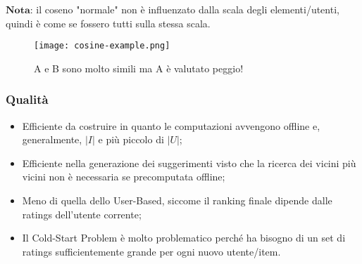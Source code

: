             $\textbf{Nota:}$ il coseno "normale" non è influenzato dalla scala degli elementi/utenti, quindi è come se fossero tutti sulla stessa scala.
                \begin{figure}[h]
                    \caption{A e B sono molto simili ma A è valutato peggio!}
                    \centering
                    \texttt{[image: cosine-example.png]}
                \end{figure}

            \subsubsection{Qualità}
                \begin{itemize}
                    \item Efficiente da costruire in quanto le computazioni avvengono offline e, generalmente, $|I|$ e più piccolo di $|U|$;
                    \item Efficiente nella generazione dei suggerimenti visto che la ricerca dei vicini più vicini non è necessaria se precomputata offline;
                    \item Meno di quella dello User-Based, siccome il ranking finale dipende dalle ratings dell'utente corrente;
                    \item Il Cold-Start Problem è molto problematico perché ha bisogno di un set di ratings sufficientemente grande per ogni nuovo utente/item.
                \end{itemize}

\clearpage